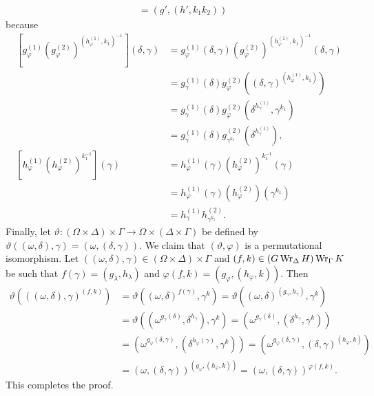 \begin{sketch}
\begin{align*}
	&= (g',(h',k_1k_2))
\end{align*}
because
\begin{align*}
\left[g_\varphi^{(1)}(g_\varphi^{(2)})^{(h_\varphi^{(1)},k_1)^{-1}}\right] (\delta,\gamma) &= g_\varphi^{(1)}(\delta,\gamma) (g_\varphi^{(2)})^{(h_\varphi^{(1)},k_1)^{-1}}(\delta,\gamma)
\\
&= g_\gamma^{(1)}(\delta) g_\varphi^{(2)}((\delta,\gamma)^{(h_\varphi^{(1)},k_1)})
\\
&= g_\gamma^{(1)}(\delta) g_\varphi^{(2)}(\delta^{h_\gamma^{(1)}},\gamma^{k_1})
\\
&= g_\gamma^{(1)}(\delta) g_{\gamma^{k_1}}^{(2)}(\delta^{h_\gamma^{(1)}}),
\\
\left[h_\varphi^{(1)}(h_\varphi^{(2)})^{k_1^{-1}} \right](\gamma)&=  h_\varphi^{(1)}(\gamma)(h_\varphi^{(2)})^{k_1^{-1}}(\gamma)
\\
&= h_\varphi^{(1)}(\gamma)(h_\varphi^{(2)})(\gamma^{k_1})
\\
&= h_\gamma^{(1)}h_{\gamma^{k_1}}^{(2)}.
\end{align*}
Finally, let $\vartheta:(\Omega\times \Delta)\times \Gamma \to \Omega\times (\Delta\times \Gamma)$ be defined by $\vartheta((\omega,\delta),\gamma) = (\omega,(\delta,\gamma))$. We claim that $(\vartheta,\varphi)$ is a permutational isomorphism. Let $((\omega,\delta),\gamma)\in (\Omega\times \Delta)\times \Gamma$ and $(f,k)\in (G\operatorname{Wr}_\Delta H) \operatorname{Wr}_\Gamma K$ be such that $f(\gamma)= (g_\lambda,h_\lambda)$ and $\varphi(f,k) = (g_\varphi,(h_\varphi,k))$. Then
\begin{align*}
	\vartheta\left(((\omega,\delta),\gamma)^{(f,k)}\right) &= \vartheta\left((\omega,\delta)^{f(\gamma)},\gamma^k\right) = \vartheta\left((\omega,\delta)^{(g_\gamma,h_\gamma)},\gamma^k\right)
	 \\
	 &= \vartheta\left((\omega^{g_\gamma(\delta)},\delta^{h_\gamma}),\gamma^k\right)
	 = \left(\omega^{g_\gamma(\delta)},(\delta^{h_\gamma},\gamma^k)\right)
	 \\
	 &= \left(\omega^{g_{\varphi}(\delta,\gamma)},(\delta^{h_\varphi(\gamma)},\gamma^k)\right)
	= \left(\omega^{g_{\varphi}(\delta,\gamma)},(\delta,\gamma)^{(h_\varphi,k)}\right)
	 \\
	 &= (\omega,(\delta,\gamma))^{(g_{\varphi},(h_\varphi,k))}
	  = (\omega,(\delta,\gamma))^{\varphi(f,k)}.
\end{align*}
This completes the proof.
\end{sketch}


